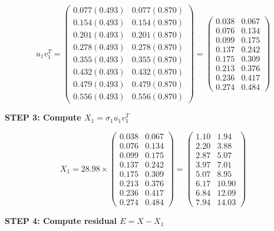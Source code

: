 \documentclass[12pt]{article}
\begin{document}
\begin{solution}
\[
u_1 v_1^T = \begin{pmatrix}
0.077(0.493) & 0.077(0.870) \\
0.154(0.493) & 0.154(0.870) \\
0.201(0.493) & 0.201(0.870) \\
0.278(0.493) & 0.278(0.870) \\
0.355(0.493) & 0.355(0.870) \\
0.432(0.493) & 0.432(0.870) \\
0.479(0.493) & 0.479(0.870) \\
0.556(0.493) & 0.556(0.870)
\end{pmatrix} = \begin{pmatrix}
0.038 & 0.067 \\
0.076 & 0.134 \\
0.099 & 0.175 \\
0.137 & 0.242 \\
0.175 & 0.309 \\
0.213 & 0.376 \\
0.236 & 0.417 \\
0.274 & 0.484
\end{pmatrix}
\]

\textbf{STEP 3: Compute $X_1 = \sigma_1 u_1 v_1^T$}

\[
X_1 = 28.98 \times \begin{pmatrix}
0.038 & 0.067 \\
0.076 & 0.134 \\
0.099 & 0.175 \\
0.137 & 0.242 \\
0.175 & 0.309 \\
0.213 & 0.376 \\
0.236 & 0.417 \\
0.274 & 0.484
\end{pmatrix} = \begin{pmatrix}
1.10 & 1.94 \\
2.20 & 3.88 \\
2.87 & 5.07 \\
3.97 & 7.01 \\
5.07 & 8.95 \\
6.17 & 10.90 \\
6.84 & 12.09 \\
7.94 & 14.03
\end{pmatrix}
\]

\textbf{STEP 4: Compute residual $E = X - X_1$}


\end{solution}
\end{document}
